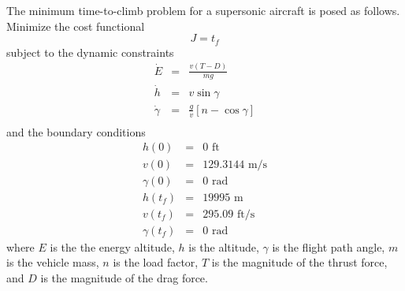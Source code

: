 \documentclass[10pt,final]{report}
\begin{document}
The minimum time-to-climb problem for a supersonic aircraft is posed
as follows.  Minimize the cost functional
\begin{equation}
  J = t_f
\end{equation}
subject to the dynamic constraints
\begin{eqnarray}
  \dot{E} & = & \frac{v(T-D)}{mg} \\
  \dot{h} & = & v\sin\gamma \\
  \dot{\gamma} & = & \frac{g}{v}\left[n-\cos\gamma\right] \\
\end{eqnarray}
and the boundary conditions
\begin{eqnarray}
  h(0) & = & 0 \textrm{ ft} \\
  v(0) & = & 129.3144 \textrm{ m/s} \\
  \gamma(0) & = & 0 \textrm{ rad} \\
  h(t_f) & = & 19995 \textrm{ m} \\
  v(t_f) & = & 295.09 \textrm{ ft/s} \\
  \gamma(t_f) & = & 0 \textrm{ rad}
\end{eqnarray}
where $E$ is the the energy altitude, $h$ is the altitude, $\gamma$ is the
flight path angle, $m$ is the vehicle mass, $n$ is the load factor,
$T$ is the magnitude of the thrust force, and $D$ is the magnitude
of the drag force.
\end{document}
